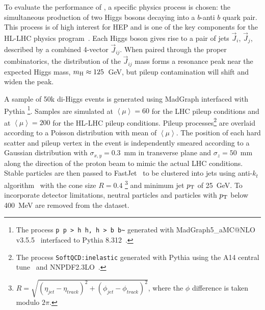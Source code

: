 To evaluate the performance of \myname{}, a specific physics process is chosen: the simultaneous production of two Higgs bosons decaying into a $b$-anti $b$ quark pair. This process is of high interest for HEP and is one of the key components for the HL-LHC physics program~\cite{Dainese:2019rgk}. Each Higgs boson gives rise to a pair of jets $\overrightarrow{J}_i$, $\overrightarrow{J}_j$, described by a combined 4-vector $\overrightarrow{J}_{ij}$. When paired through the proper combinatorics, the distribution of the $\overrightarrow{J}_{ij}$ mass forms a resonance peak near the expected Higgs mass, $m_{\rm H}\approx125$~GeV, but pileup contamination will shift and widen the peak.


A sample of 50k di-Higgs events is generated using MadGraph interfaced with Pythia \footnote{The process \texttt{p p > h h, h > b b\~{}} generated with MadGraph5\_aMC@NLO v3.5.5~\cite{madgraph} interfaced to Pythia 8.312~\cite{pythia}.}. Samples are simulated at $\left\langle \mu \right\rangle = 60$ for the LHC pileup conditions and at $\left\langle \mu \right\rangle = 200$ for the HL-LHC pileup conditions. Pileup processes\footnote{The process \texttt{SoftQCD:inelastic} generated with Pythia using the A14 central tune~\cite{TheATLAScollaboration:2014rfk} and NNPDF2.3LO~\cite{BALL2013244}.} are overlaid according to a Poisson distribution with mean of $\left<\mu\right>$. The position of each hard scatter and pileup vertex in the event is independently smeared according to a Gaussian distribution with $\sigma_{x,y}=0.3$~mm in transverse plane and $\sigma_z=50$~mm along the direction of the proton beam to mimic the actual LHC conditions. Stable particles are then passed to FastJet~\cite{Cacciari_2012} to be clustered into jets using anti-$k_t$ algorithm~\cite{Cacciari_2008} with the cone size $R=0.4$ \footnote{$R = \sqrt{( \eta_{jet} - \eta_{track})^2 + ( \phi_{jet} - \phi_{track})^2}$, where the $\phi$ difference is taken modulo $2\pi$.} and minimum jet $p_{\rm T}$ of 25~GeV. To incorporate detector limitations, neutral particles and particles with $p_{\rm T}$ below 400~MeV are removed from the dataset.
